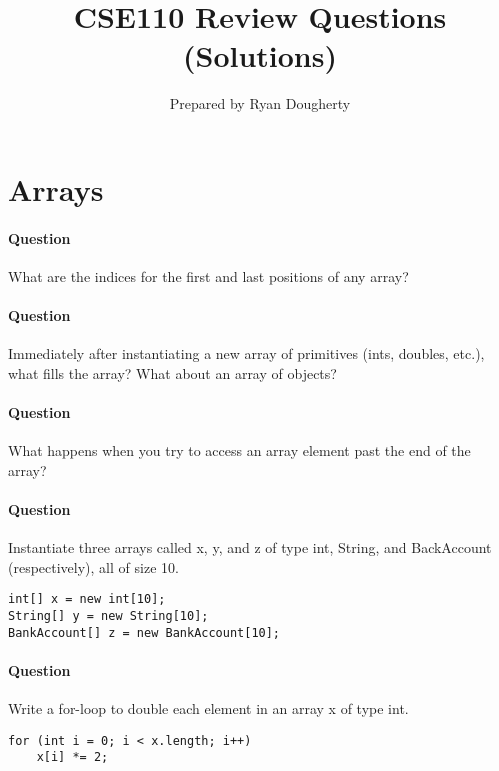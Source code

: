\documentclass{article}
\title{CSE110 Review Questions (Solutions)}
\author{Prepared by Ryan Dougherty}
\date{}
\begin{document}
\maketitle

\section*{Arrays}


\setcounter{question_num}{1}
\paragraph{Question }
What are the indices for the first and last positions of any array?

\addtocounter{question_num}{1}
\paragraph{Question }
Immediately after instantiating a new array of primitives (ints, doubles, etc.), what fills the array? What about an array of objects?

\addtocounter{question_num}{1}
\paragraph{Question }
What happens when you try to access an array element past the end of the array?

\addtocounter{question_num}{1}
\paragraph{Question }
Instantiate three arrays called x, y, and z of type int, String, and BackAccount (respectively), all of size 10.
\begin{lstlisting}
int[] x = new int[10];
String[] y = new String[10];
BankAccount[] z = new BankAccount[10];
\end{lstlisting}

\addtocounter{question_num}{1}
\paragraph{Question }
Write a for-loop to double each element in an array x of type int.
\begin{lstlisting}
for (int i = 0; i < x.length; i++)
	x[i] *= 2;
\end{lstlisting}
\end{document}
